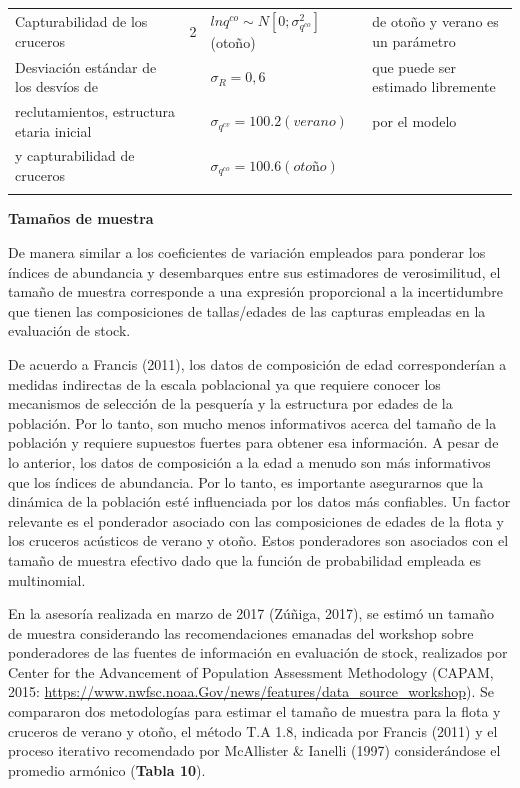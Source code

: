 \documentclass[
  spanish,
]{article}
\begin{document}
\begin{table}[h]
{\begin{tabular}{|l|c|l|l|}
Capturabilidad de los cruceros            &  2         & $ln q^{co} \sim N[0;\sigma_{q^{co}}^2]$ (otoño)  &  de otoño y verano es un parámetro\\
Desviación estándar de los desvíos de     &            & $\sigma_R = 0,6$                                 & que puede ser estimado libremente\\
reclutamientos, estructura etaria inicial &            & $\sigma_{q^{cv}} = 100.2 (verano)$                & por el modelo\\
y capturabilidad de cruceros              &            & $\sigma_{q^{co}} = 100.6 (otoño)$                 &\\ 
                                          &            &                                                  & \\ \hline
  \end{tabular}}
        \end{table}

\normalsize

\textbf{Tamaños de muestra}

De manera similar a los coeficientes de variación empleados para
ponderar los índices de abundancia y desembarques entre sus estimadores
de verosimilitud, el tamaño de muestra corresponde a una expresión
proporcional a la incertidumbre que tienen las composiciones de
tallas/edades de las capturas empleadas en la evaluación de stock.

De acuerdo a Francis (2011), los datos de composición de edad
corresponderían a medidas indirectas de la escala poblacional ya que
requiere conocer los mecanismos de selección de la pesquería y la
estructura por edades de la población. Por lo tanto, son mucho menos
informativos acerca del tamaño de la población y requiere supuestos
fuertes para obtener esa información. A pesar de lo anterior, los datos
de composición a la edad a menudo son más informativos que los índices
de abundancia. Por lo tanto, es importante asegurarnos que la dinámica
de la población esté influenciada por los datos más confiables. Un
factor relevante es el ponderador asociado con las composiciones de
edades de la flota y los cruceros acústicos de verano y otoño. Estos
ponderadores son asociados con el tamaño de muestra efectivo dado que la
función de probabilidad empleada es multinomial.

En la asesoría realizada en marzo de 2017 (Zúñiga, 2017), se estimó un
tamaño de muestra considerando las recomendaciones emanadas del workshop
sobre ponderadores de las fuentes de información en evaluación de stock,
realizados por Center for the Advancement of Population Assessment
Methodology (CAPAM, 2015:
\url{https://www.nwfsc.noaa.Gov/news/features/data_source_workshop}). Se
compararon dos metodologías para estimar el tamaño de muestra para la
flota y cruceros de verano y otoño, el método T.A 1.8, indicada por
Francis (2011) y el proceso iterativo recomendado por McAllister \&
Ianelli (1997) considerándose el promedio armónico (\textbf{Tabla 10}).
\end{document}
